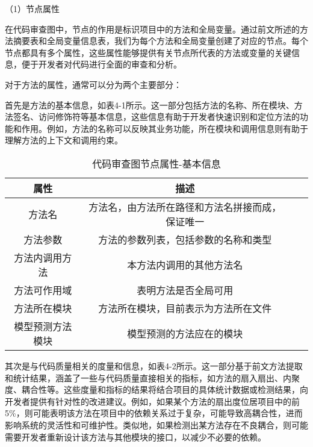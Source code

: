 （1）节点属性

在代码审查图中，节点的作用是标识项目中的方法和全局变量。通过前文所述的方法摘要表和全局变量信息表，我们为每个方法和全局变量创建了对应的节点。每个节点都具有多个属性，这些属性能够提供有关节点所代表的方法或变量的关键信息，便于开发者对代码进行全面的审查和分析。

对于方法的属性，通常可以分为两个主要部分：

首先是方法的基本信息，如表4-1所示。这一部分包括方法的名称、所在模块、方法签名、访问修饰符等基本信息，这些信息有助于开发者快速识别和定位方法的功能和作用。例如，方法的名称可以反映其业务功能，所在模块和调用信息则有助于理解方法的上下文和调用约束。


\begin{table}[htbp]
\caption{代码审查图节点属性-基本信息}
\vspace{0.5em}\centering\wuhao
\begin{tabular}{cccc}
\toprule
 属性 & 描述 \\
\midrule
方法名 & 方法名，由方法所在路径和方法名拼接而成，保证唯一  \\
方法参数 & 方法的参数列表，包括参数的名称和类型   \\
方法内调用方法 & 本方法内调用的其他方法名   \\
方法可作用域 & 表明方法是否全局可用   \\
方法所在模块 &  方法所在模块，目前表示为方法所在文件  \\
模型预测方法模块 & 模型预测的方法应在的模块   \\     
\bottomrule
\end{tabular}
\end{table}

其次是与代码质量相关的度量和信息，如表4-2所示。这一部分基于前文方法提取和统计结果，涵盖了一些与代码质量直接相关的指标，如方法的扇入扇出、内聚度、耦合性等。这些度量和指标的结果将结合项目的具体统计数据或检测结果，向开发者提供有针对性的改进建议。例如，如果某个方法的扇出度位居项目中的前5\%，则可能表明该方法在项目中的依赖关系过于复杂，可能导致高耦合性，进而影响系统的灵活性和可维护性。类似地，如果检测出某方法存在不良耦合，则可能需要开发者重新设计该方法与其他模块的接口，以减少不必要的依赖。

